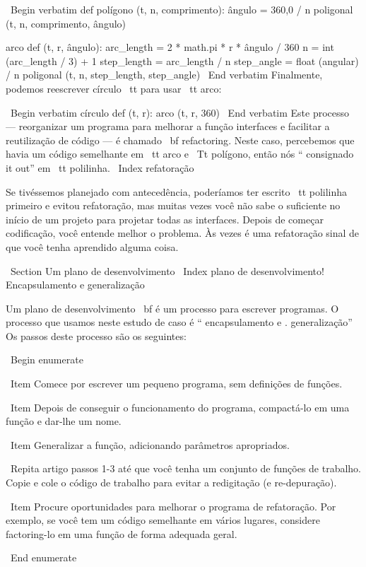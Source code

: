 \documentclass[10pt]{book}
\begin{document}
\begin {itemize}
{\ Begin {verbatim}
def polígono (t, n, comprimento):
    ângulo = 360,0 / n
    poligonal (t, n, comprimento, ângulo)

arco def (t, r, ângulo):
    arc_length = 2 * math.pi * r * ângulo / 360
    n = int (arc_length / 3) + 1
    step_length = arc_length / n
    step_angle = float (angular) / n
    poligonal (t, n, step_length, step_angle)
\ End {verbatim}
%
Finalmente, podemos reescrever {círculo \ tt} para usar {\ tt arco}:

\ Begin {verbatim}
círculo def (t, r):
    arco (t, r, 360)
\ End {verbatim}
%
Este processo --- reorganizar um programa para melhorar a função
interfaces e facilitar a reutilização de código --- é chamado {\ bf refactoring}.
Neste caso, percebemos que havia um código semelhante em {\ tt arco} e
{\ Tt polígono}, então nós `` consignado it out'' em {\ tt polilinha}.
\ Index {} refatoração

Se tivéssemos planejado com antecedência, poderíamos ter escrito {\ tt polilinha} primeiro
e evitou refatoração, mas muitas vezes você não sabe o suficiente no
início de um projeto para projetar todas as interfaces. Depois de começar
codificação, você entende melhor o problema. Às vezes é uma refatoração
sinal de que você tenha aprendido alguma coisa.


\ Section {Um plano de desenvolvimento}
\ Index {plano de desenvolvimento! Encapsulamento e generalização}

Um plano de desenvolvimento {\ bf} é um processo para escrever programas.
O processo que usamos
neste estudo de caso é `` encapsulamento e
. generalização'' Os passos deste processo são os seguintes:

\ Begin {enumerate}

\ Item Comece por escrever um pequeno programa, sem definições de funções.

\ Item Depois de conseguir o funcionamento do programa, compactá-lo em uma função
e dar-lhe um nome.

\ Item Generalizar a função, adicionando parâmetros apropriados.

\ Repita artigo passos 1-3 até que você tenha um conjunto de funções de trabalho.
Copie e cole o código de trabalho para evitar a redigitação (e re-depuração).

\ Item Procure oportunidades para melhorar o programa de refatoração.
Por exemplo, se você tem um código semelhante em vários lugares, considere
factoring-lo em uma função de forma adequada geral.

\ End {enumerate}

}
\end{itemize}
\end{document}
